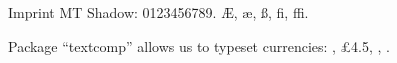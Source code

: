 \documentclass{article}
\begin{document}
\imprintmtshadowfamily

Imprint MT Shadow: 0123456789. \AE, \ae, \ss, fi, ffi. \kant[1]



Package ``textcomp'' allows us to typeset currencies: ,
\pounds4.5, , .

\end{document}
